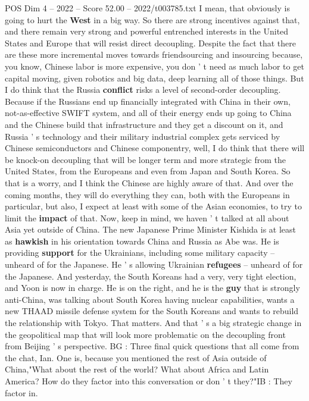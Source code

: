 \begin{textsample}{POS Dim 4 – 2022 – Score 52.00 – 2022/t003785.txt}
I mean, that obviously is going to hurt the \textbf{West} in a big way.
So there are strong incentives against that, and there remain very strong and powerful entrenched interests in the United States and Europe that will resist direct decoupling.
Despite the fact that there are these more incremental moves towards friendsourcing and insourcing because, you know, Chinese labor is more expensive, you don ' t need as much labor to get capital moving, given robotics and big data, deep learning all of those things.
But I do think that the Russia \textbf{conflict} risks a level of second-order decoupling.
Because if the Russians end up financially integrated with China in their own, not-as-effective SWIFT system, and all of their energy ends up going to China and the Chinese build that infrastructure and they get a discount on it, and Russia ' s technology and their military industrial complex gets serviced by Chinese semiconductors and Chinese componentry, well, I do think that there will be knock-on decoupling that will be longer term and more strategic from the United States, from the Europeans and even from Japan and South Korea.
So that is a worry, and I think the Chinese are highly aware of that.
And over the coming months, they will do everything they can, both with the Europeans in particular, but also, I expect at least with some of the Asian economies, to try to limit the \textbf{impact} of that.
Now, keep in mind, we haven ' t talked at all about Asia yet outside of China.
The new Japanese Prime Minister Kishida is at least as \textbf{hawkish} in his orientation towards China and Russia as Abe was.
He is providing \textbf{support} for the Ukrainians, including some military capacity -- unheard of for the Japanese.
He ' s allowing Ukrainian \textbf{refugees} -- unheard of for the Japanese.
And yesterday, the South Koreans had a very, very tight election, and Yoon is now in charge.
He is on the right, and he is the \textbf{guy} that is strongly anti-China, was talking about South Korea having nuclear capabilities, wants a new THAAD missile defense system for the South Koreans and wants to rebuild the relationship with Tokyo.
That matters.
And that ' s a big strategic change in the geopolitical map that will look more problematic on the decoupling front from Beijing ' s perspective.
BG : Three final quick questions that all come from the chat, Ian.
One is, because you mentioned the rest of Asia outside of China,"What about the rest of the world?
What about Africa and Latin America?
How do they factor into this conversation or don ' t they?"IB : They factor in.

\end{textsample}

